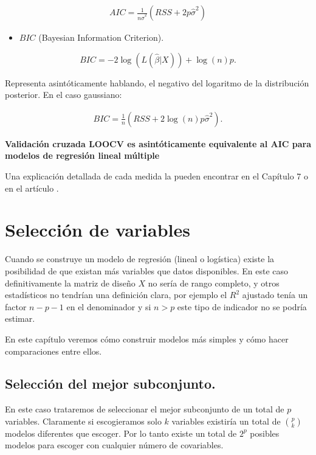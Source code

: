 \documentclass[
  12pt,
]{book}
\providecommand{\tightlist}{%
  \setlength{\itemsep}{0pt}\setlength{\parskip}{0pt}}
\theoremstyle{definition}
\theoremstyle{definition}
\theoremstyle{definition}
\theoremstyle{definition}
\theoremstyle{remark}
\begin{document}
\begin{align*}
AIC = \frac{1}{n\hat \sigma^2}(RSS+2p\hat \sigma^2)
\end{align*}

\begin{itemize}
\tightlist
\item
  \(BIC\) (Bayesian Information Criterion).
\end{itemize}

\[
BIC = -2\log(L(\hat{\beta} \vert X)) + \log(n)p. 
\]

Representa asintóticamente hablando, el negativo del logaritmo de la distribución posterior. En el caso gaussiano:

\begin{align*}
BIC = \frac{1}{n}(RSS+2\log (n)p\hat \sigma^2).
\end{align*}

\textbf{Validación cruzada LOOCV es asintóticamente equivalente al AIC para modelos de regresión lineal múltiple \autocite{StoneAsymptotic1977}}

Una explicación detallada de cada medida la pueden encontrar en el Capítulo 7 \autocite{HastieElements2009} o en el artículo \autocite{CavanaughAkaike2019}.

\hypertarget{selecciuxf3n-de-variables}{%
\section{Selección de variables}\label{selecciuxf3n-de-variables}}

Cuando se construye un modelo de regresión (lineal o logística) existe la posibilidad de que existan más variables que datos disponibles. En este caso definitivamente la matriz de diseño \(X\) no sería de rango completo, y otros estadísticos no tendrían una definición clara, por ejemplo el \(R^{2}\) ajustado tenía un factor \(n-p-1\) en el denominador y si \(n>p\) este tipo de indicador no se podría estimar.

En este capítulo veremos cómo construir modelos más simples y cómo hacer comparaciones entre ellos.

\hypertarget{selecciuxf3n-del-mejor-subconjunto.}{%
\subsection{Selección del mejor subconjunto.}\label{selecciuxf3n-del-mejor-subconjunto.}}

En este caso trataremos de seleccionar el mejor subconjunto de un total de \(p\) variables. Claramente si escogieramos solo \(k\) variables existiría un total de \(\binom{p}{k}\) modelos diferentes que escoger. Por lo tanto existe un total de \(2^p\) posibles modelos para escoger con cualquier número de covariables.
\end{document}
